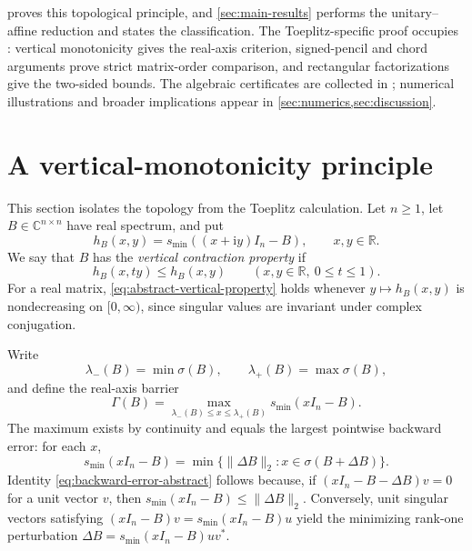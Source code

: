 \documentclass[11pt,a4paper]{article}
\numberwithin{equation}{section}
\newcommand{\C}{\mathbb C}
\newcommand{\R}{\mathbb R}
\newcommand{\ii}{\mathrm i}
\begin{document}
 proves this topological principle, and
\cref{sec:main-results} performs the unitary--affine reduction and states the
classification.  The Toeplitz-specific proof occupies
: vertical monotonicity gives the
real-axis criterion, signed-pencil and chord arguments prove strict
matrix-order comparison, and rectangular factorizations give the two-sided
bounds.  The algebraic certificates are collected in
; numerical
illustrations and broader implications appear in
\cref{sec:numerics,sec:discussion}.

\section{A vertical-monotonicity principle}
\label{sec:topological-reduction}

This section isolates the topology from the Toeplitz calculation.  Let
\(n\geq1\), let \(B\in\C^{n\times n}\) have real spectrum, and put
\[
 h_B(x,y)=s_{\min}((x+\ii y)I_n-B),\qquad x,y\in\R.
\]
We say that \(B\) has the \emph{vertical contraction property} if
\begin{equation}\label{eq:abstract-vertical-property}
 h_B(x,ty)\leq h_B(x,y)
 \qquad(x,y\in\R,\ 0\leq t\leq1).
\end{equation}
For a real matrix, \eqref{eq:abstract-vertical-property} holds whenever
\(y\mapsto h_B(x,y)\) is nondecreasing on \([0,\infty)\), since singular
values are invariant under complex conjugation.

Write
\[
 \lambda_-(B)=\min\sigma(B),\qquad
 \lambda_+(B)=\max\sigma(B),
\]
and define the real-axis barrier
\begin{equation}\label{eq:abstract-barrier}
 \Gamma(B)=\max_{\lambda_-(B)\leq x\leq\lambda_+(B)}
 s_{\min}(xI_n-B).
\end{equation}
The maximum exists by continuity and equals the largest pointwise backward
error: for each \(x\),
\begin{equation}\label{eq:backward-error-abstract}
 s_{\min}(xI_n-B)=
 \min\{\lVert\Delta B\rVert_2:x\in\sigma(B+\Delta B)\}.
\end{equation}
Identity \eqref{eq:backward-error-abstract} follows because, if
\((xI_n-B-\Delta B)v=0\) for a unit vector \(v\), then
\(s_{\min}(xI_n-B)\leq\lVert\Delta B\rVert_2\).  Conversely, unit singular
vectors satisfying \((xI_n-B)v=s_{\min}(xI_n-B)u\) yield the minimizing
rank-one perturbation \(\Delta B=s_{\min}(xI_n-B)uv^*\).
\end{document}
